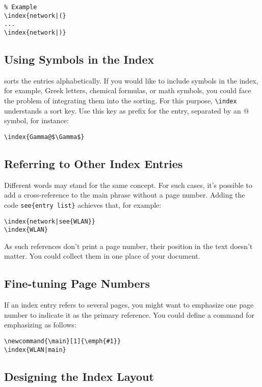 \begin{lstlisting}
% Example
\index{network|(}
...
\index{network|)}
\end{lstlisting}


\subsection[Symbols in the Index]{Using Symbols in the Index}
\label{sec:using-symbols-macros}

 sorts the entries alphabetically.
If you would like to include symbols in the index, for example, Greek letters, chemical formulas, or math symbols, you could face the problem of integrating them into the sorting.
For this purpose, \lstinline|\index| understands a sort key.
Use this key as prefix for the entry, separated by an @ symbol, for instance:
\begin{lstlisting}
\index{Gamma@$\Gamma$}
\end{lstlisting}

\subsection{Referring to Other Index Entries}
\label{sec:referr-other-index}


Different words may stand for the same concept.
For such cases, it's possible to add a cross-reference to the main phrase without a page number.
Adding the code \lstinline.see{entry list}. achieves that, for example:
\begin{lstlisting}
\index{network|see{WLAN}}
\index{WLAN}
\end{lstlisting}

As such references don't print a page number, their position in the text doesn't matter. You could collect them in one place of your document.


\subsection{Fine-tuning Page Numbers}
\label{sec:fine-tuning-page}

If an index entry refers to several pages, you might want to emphasize one page number to indicate it as the primary reference.
You could define a command for emphasizing as follows:
\begin{lstlisting}
\newcommand{\main}[1]{\emph{#1}}
\index{WLAN|main}
\end{lstlisting}


\subsection{Designing the Index Layout}
\label{sec:design-index-layo}


